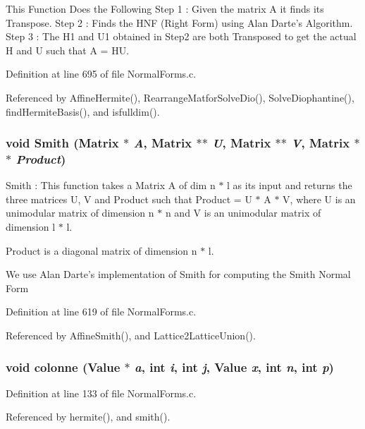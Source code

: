 This Function Does the Following Step 1 : Given the matrix A it finds its Transpose. Step 2 : Finds the HNF (Right Form) using Alan Darte's Algorithm. Step 3 : The H1 and U1 obtained in Step2 are both Transposed to get the actual H and U such that A = HU. 

Definition at line 695 of file Normal\-Forms.c.

Referenced by Affine\-Hermite(), Rearrange\-Matfor\-Solve\-Dio(), Solve\-Diophantine(), find\-Hermite\-Basis(), and isfulldim().

\subsubsection{\setlength{\rightskip}{0pt plus 5cm}void Smith (Matrix $\ast$ {\em A}, Matrix $\ast$$\ast$ {\em U}, Matrix $\ast$$\ast$ {\em V}, Matrix $\ast$$\ast$ {\em Product})}\label{NormalForms_8c_a15}


Smith : This function takes a Matrix A of dim n $\ast$ l as its input and returns the three matrices U, V and Product such that Product = U $\ast$ A $\ast$ V, where U is an unimodular matrix of dimension n $\ast$ n and V is an unimodular matrix of dimension l $\ast$ l.

Product is a diagonal matrix of dimension n $\ast$ l.

We use Alan Darte's implementation of Smith for computing the Smith Normal Form 

Definition at line 619 of file Normal\-Forms.c.

Referenced by Affine\-Smith(), and Lattice2Lattice\-Union().

\subsubsection{\setlength{\rightskip}{0pt plus 5cm}void colonne (Value $\ast$ {\em a}, int {\em i}, int {\em j}, Value {\em x}, int {\em n}, int {\em p})\hspace{0.3cm}{\tt  [static]}}\label{NormalForms_8c_a5}




Definition at line 133 of file Normal\-Forms.c.

Referenced by hermite(), and smith().

